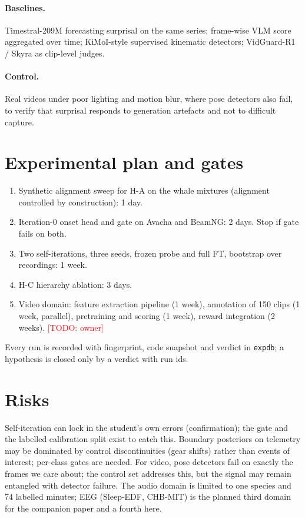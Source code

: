 \documentclass[10pt,twocolumn]{article}
\newcommand{\todo}[1]{\textcolor{red}{[TODO: #1]}}
\begin{document}
\paragraph{Baselines.} Timestral-209M forecasting surprisal on the same series; frame-wise VLM score aggregated over time; KiMoI-style supervised kinematic detectors; VidGuard-R1 / Skyra as clip-level judges.
\paragraph{Control.} Real videos under poor lighting and motion blur, where pose detectors also fail, to verify that surprisal responds to generation artefacts and not to difficult capture.

\section{Experimental plan and gates}
\begin{enumerate}\setlength{\itemsep}{1pt}
\item Synthetic alignment sweep for H-A on the whale mixtures (alignment controlled by construction): 1 day.
\item Iteration-0 onset head and gate on Avacha and BeamNG: 2 days. Stop if gate fails on both.
\item Two self-iterations, three seeds, frozen probe and full FT, bootstrap over recordings: 1 week.
\item H-C hierarchy ablation: 3 days.
\item Video domain: feature extraction pipeline (1 week), annotation of 150 clips (1 week, parallel), pretraining and scoring (1 week), reward integration (2 weeks). \todo{owner}
\end{enumerate}
Every run is recorded with fingerprint, code snapshot and verdict in \texttt{expdb}; a hypothesis is closed only by a verdict with run ids.

\section{Risks}
Self-iteration can lock in the student's own errors (confirmation); the gate and the labelled calibration split exist to catch this. Boundary posteriors on telemetry may be dominated by control discontinuities (gear shifts) rather than events of interest; per-class gates are needed. For video, pose detectors fail on exactly the frames we care about; the control set addresses this, but the signal may remain entangled with detector failure. The audio domain is limited to one species and 74 labelled minutes; EEG (Sleep-EDF, CHB-MIT) is the planned third domain for the companion paper and a fourth here.
\end{document}
